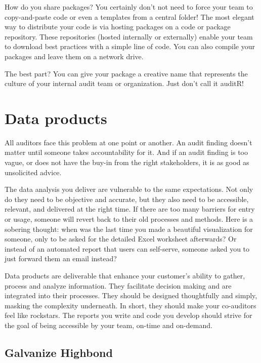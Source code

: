 \documentclass[
]{book}
\begin{document}
How do you share packages? You certainly don't not need to force your team to copy-and-paste code or even a templates from a central folder! The most elegant way to distribute your code is via hosting packages on a code or package repository. These repositories (hosted internally or externally) enable your team to download best practices with a simple line of code. You can also compile your packages and leave them on a network drive.

The best part? You can give your package a creative name that represents the culture of your internal audit team or organization. Just don't call it auditR!

\hypertarget{data-products}{%
\section{Data products}\label{data-products}}

All auditors face this problem at one point or another. An audit finding doesn't matter until someone takes accountability for it. And if an audit finding is too vague, or does not have the buy-in from the right stakeholders, it is as good as unsolicited advice.

The data analysis you deliver are vulnerable to the same expectations. Not only do they need to be objective and accurate, but they also need to be accessible, relevant, and delivered at the right time. If there are too many barriers for entry or usage, someone will revert back to their old processes and methods. Here is a sobering thought: when was the last time you made a beautiful visualization for someone, only to be asked for the detailed Excel worksheet afterwards? Or instead of an automated report that users can self-serve, someone asked you to just forward them an email instead?

Data products are deliverable that enhance your customer's ability to gather, process and analyze information. They facilitate decision making and are integrated into their processes. They should be designed thoughtfully and simply, masking the complexity underneath. In short, they should make your co-auditors feel like rockstars. The reports you write and code you develop should strive for the goal of being accessible by your team, on-time and on-demand.

\hypertarget{galvanize-highbond}{%
\subsection{Galvanize Highbond}\label{galvanize-highbond}}
\end{document}
